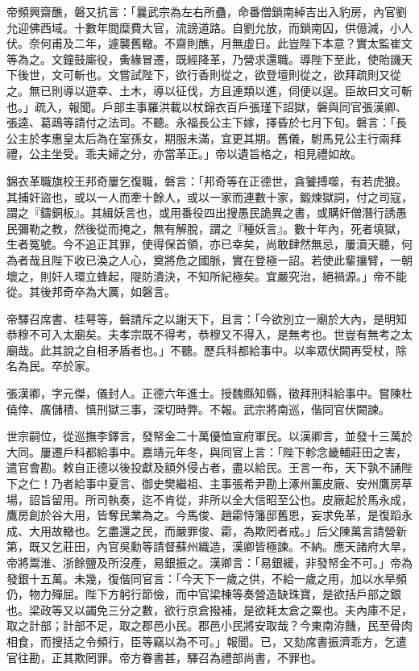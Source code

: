 \begin{pinyinscope}
帝頻興齋醮，磐又抗言：「曩武宗為左右所蠱，命番僧鎖南綽吉出入豹房，內官劉允迎佛西域。十數年間糜費大官，流謗道路。自劉允放，而鎖南囚，供億減，小人伏。奈何甫及二年，遽襲舊轍。不齋則醮，月無虛日。此豈陛下本意？實太監崔文等為之。文鐘鼓廝役，夤緣冒遷，既經降革，乃營求還職。導陛下至此，使貽譏天下後世，文可斬也。文嘗試陛下，欲行香則從之，欲登壇則從之，欲拜疏則又從之。無已則導以遊幸、土木，導以征伐，方且連類以進，伺便以逞。臣故曰文可斬也。」疏入，報聞。戶部主事羅洪載以杖錦衣百戶張瑾下詔獄，磐與同官張漢卿、張逵、葛鴊等請付之法司。不聽。永福長公主下嫁，擇昏於七月下旬。磐言：「長公主於孝惠皇太后為在室孫女，期服未滿，宜更其期。舊儀，駙馬見公主行兩拜禮，公主坐受。乖夫婦之分，亦當革正。」帝以遺旨格之，相見禮如故。

錦衣革職旗校王邦奇屢乞復職，磐言：「邦奇等在正德世，貪饕搏噬，有若虎狼。其捕奸盜也，或以一人而牽十餘人，或以一家而連數十家，鍛煉獄詞，付之司寇，謂之『鑄銅板』。其緝妖言也，或用番役四出搜愚民詭異之書，或購奸僧潛行誘愚民彌勒之教，然後從而掩之，無有解脫，謂之『種妖言』。數十年內，死者填獄，生者冤號。今不追正其罪，使得保首領，亦已幸矣，尚敢肆然無忌，屢瀆天聽，何為者哉且陛下收已渙之人心，奠將危之國脈，實在登極一詔。若使此輩攘臂，一朝壞之，則奸人環立蜂起，隄防潰決，不知所紀極矣。宜嚴究治，絕禍源。」帝不能從。其後邦奇卒為大厲，如磐言。

帝驛召席書、桂萼等，磐請斥之以謝天下，且言：「今欲別立一廟於大內，是明知恭穆不可入太廟矣。夫孝宗既不得考，恭穆又不得入，是無考也。世豈有無考之太廟哉。此其說之自相矛盾者也。」不聽。歷兵科都給事中。以率眾伏闕再受杖，除名為民。卒於家。

張漢卿，字元傑，儀封人。正德六年進士。授魏縣知縣，徵拜刑科給事中。嘗陳杜僥倖、廣儲積、慎刑獄三事，深切時弊。不報。武宗將南巡，偕同官伏闕諫。

世宗嗣位，從巡撫李鐸言，發帑金二十萬優恤宣府軍民。以漢卿言，並發十三萬於大同。屢遷戶科都給事中。嘉靖元年冬，與同官上言：「陛下軫念畿輔莊田之害，遣官會勘。敕自正德以後投獻及額外侵占者，盡以給民。王言一布，天下孰不誦陛下之仁！乃者給事中夏言、御史樊繼祖、主事張希尹勘上涿州薰皮廠、安州鷹房草場，詔旨留用。所司執奏，迄不肯從，非所以全大信昭至公也。皮廠起於馬永成，鷹房創於谷大用，皆奪民業為之。今馬俊、趙霦恃籓邸舊恩，妄求免革，是復蹈永成、大用故轍也。乞盡還之民，而嚴罪俊、霦，為欺罔者戒。」后父陳萬言請營新第，既又乞莊田，內官吳勳等請督蘇州織造，漢卿皆極諫。不納。應天諸府大旱，帝將鬻淮、浙餘鹽及所沒產，易銀振之。漢卿言：「易銀緩，非發帑金不可。」帝為發銀十五萬。未幾，復偕同官言：「今天下一歲之供，不給一歲之用，加以水旱頻仍，物力殫屈。陛下方躬行節儉，而中官梁棟等奏營造缺珠寶，是欲括戶部之銀也。梁政等又以蠲免三分之數，欲行京倉撥補，是欲耗太倉之粟也。夫內庫不足，取之計部；計部不足，取之郡邑小民。郡邑小民將安取哉？今東南洊饑，民至骨肉相食，而搜括之令頻行，臣等竊以為不可。」報聞。已，又劾席書振濟乖方，乞遣官往勘，正其欺罔罪。帝方眷書甚，驛召為禮部尚書，不罪也。


\end{pinyinscope}
